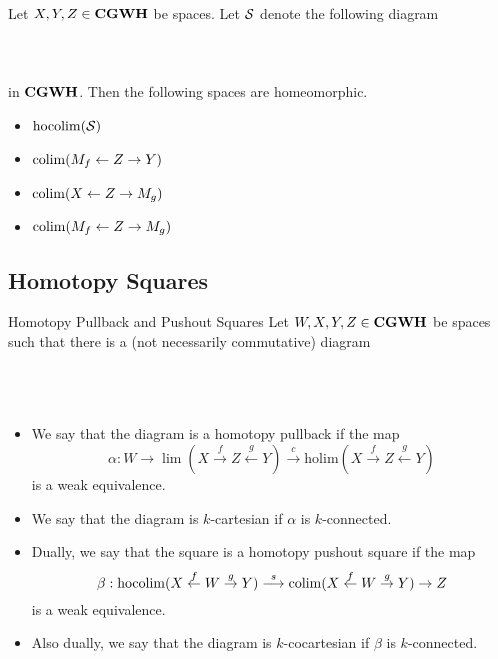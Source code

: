 \documentclass[a4paper]{article}
\begin{document}
\begin{prp}{}{} Let $X,Y,Z\in\bold{CGWH}$ be spaces. Let $\mathcal{S}$ denote the following diagram \\~\\
\\~\\
in $\bold{CGWH}$. Then the following spaces are homeomorphic. 
\begin{itemize}
\item $\operatorname*{hocolim}(\mathcal{S})$
\item $\operatorname*{colim}(M_f\leftarrow Z\rightarrow Y)$
\item $\operatorname*{colim}(X\leftarrow Z\rightarrow M_g)$
\item $\operatorname*{colim}(M_f\leftarrow Z\rightarrow M_g)$
\end{itemize}
\end{prp}

\subsection{Homotopy Squares}
\begin{defn}{Homotopy Pullback and Pushout Squares}{} Let $W,X,Y,Z\in\bold{CGWH}$ be spaces such that there is a (not necessarily commutative) diagram \\~\\
\\~\\
\begin{itemize}
\item We say that the diagram is a homotopy pullback if the map $$\alpha:W\to\lim(X\overset{f}{\rightarrow}Z\overset{g}{\leftarrow}Y)\overset{c}{\longrightarrow}\text{holim}(X\overset{f}{\rightarrow}Z\overset{g}{\leftarrow}Y)$$ is a weak equivalence. 
\item We say that the diagram is $k$-cartesian if $\alpha$ is $k$-connected. 
\item Dually, we say that the square is a homotopy pushout square if the map $$\beta:\operatorname*{hocolim}(X\overset{f}{\leftarrow}W\overset{g}{\rightarrow}Y)\overset{s}{\longrightarrow}\operatorname*{colim}(X\overset{f}{\leftarrow}W\overset{g}{\rightarrow}Y)\to Z$$ is a weak equivalence. 
\item Also dually, we say that the diagram is $k$-cocartesian if $\beta$ is $k$-connected. 
\end{itemize}
\end{defn}
\end{document}
